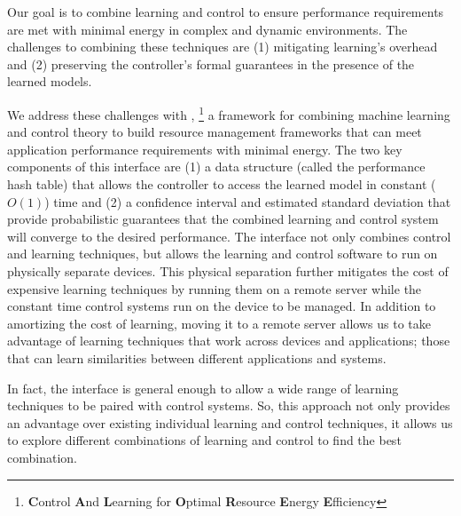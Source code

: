 Our goal is to combine learning and control to ensure performance
requirements are met with minimal energy in complex and dynamic
environments.  The challenges to combining these techniques are (1)
mitigating learning's overhead and (2) preserving the controller's
formal guarantees in the presence of the learned models.

We address these challenges with \SYSTEM{}, \footnote{\textbf{C}ontrol
  \textbf{A}nd \textbf{L}earning for \textbf{O}ptimal
  \textbf{R}esource \textbf{E}nergy \textbf{E}fficiency} a framework
for combining machine learning and control theory to build resource
management frameworks that can meet application performance
requirements with minimal energy.  The two key components of this
interface are (1) a data structure (called the performance hash table)
that allows the controller to access the learned model in constant
($O(1)$) time and (2) a confidence interval and estimated standard
deviation that provide probabilistic guarantees that the combined
learning and control system will converge to the desired performance.
The \SYSTEM{} interface not only combines control and learning
techniques, but allows the learning and control software to run on
physically separate devices.  This physical separation further
mitigates the cost of expensive learning techniques by running them on
a remote server while the constant time control systems run on the
device to be managed.  In addition to amortizing the cost of learning,
moving it to a remote server allows us to take advantage of learning
techniques that work across devices and applications; \ie{} those that
can learn similarities between different applications and systems.

In fact, the \SYSTEM{} interface is general enough to allow a wide
range of learning techniques to be paired with control systems.  So,
this approach not only provides an advantage over existing individual
learning and control techniques, it allows us to explore different
combinations of learning and control to find the best combination.

